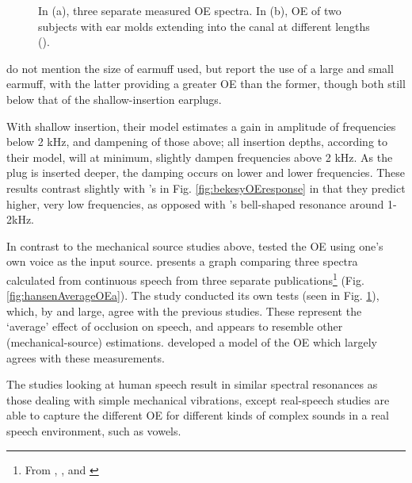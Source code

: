 \documentclass[dissertation,copyright]{uathesis}
\begin{document}
\begin{figure}
\begin{subfigure}{0.5\textwidth}
\begin{subfigure}{0.8\textwidth}
  \end{subfigure}
  \caption{ }
  \label{fig:hansenAverageOEb}
\end{subfigure}
\caption{In (a), three separate measured OE spectra. In (b), OE of two subjects with ear molds extending into the canal at different lengths (\cite{hansen:97b}).}
\label{fig:hansenAverageOE}
\end{figure}
%
\cite{dean:00} do not mention the size of earmuff used, but \cite{stenfelt:07} report the use of a large and small earmuff, with the latter providing a greater OE than the former, though both still below that of the shallow-insertion earplugs.

With shallow insertion, their model estimates a gain in amplitude of frequencies below 2 kHz, and dampening of those above; all insertion depths, according to their model, will at minimum, slightly dampen frequencies above 2 kHz.  As the plug is inserted deeper, the damping occurs on lower and lower frequencies. These results contrast slightly with \cite{bekesy:60}'s in Fig. \ref{fig:bekesyOEresponse} in that they predict higher, very low frequencies, as opposed with \cite{bekesy:60}'s bell-shaped resonance around 1-2kHz.


In contrast to the mechanical source studies above, \cite{hansen:97b} tested the OE using one's own voice as the input source.  \cite{hansen:97b} presents a graph comparing three spectra calculated from continuous speech from three separate publications\footnote{From \cite{wimmer:86}, \cite{thorup:96}, and \cite{may:92}} (Fig. \ref{fig:hansenAverageOEa}).  The study conducted its own tests (seen in Fig. \ref{fig:hansenAverageOEb}), which, by and large, agree with the previous studies.  
These represent the `average' effect of occlusion on speech, and appears to resemble other (mechanical-source) estimations.  \cite{hansen:97b} developed a model of the OE which largely agrees with these measurements.

The studies looking at human speech result in similar spectral resonances as those dealing with simple mechanical vibrations, except real-speech studies are able to capture the different OE for different kinds of complex sounds in a real speech environment, such as vowels.  
\end{document}
